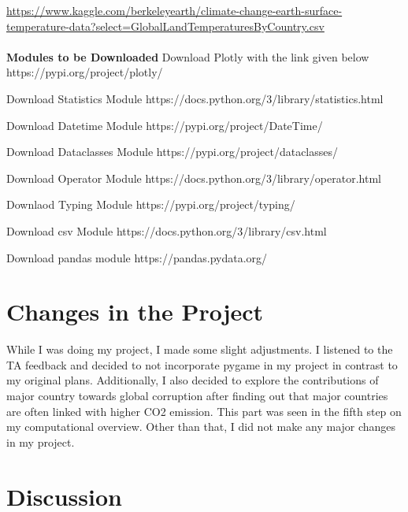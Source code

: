 \documentclass[fontsize=11pt]{article}
\begin{document}
\href{https://www.kaggle.com/berkeleyearth/climate-change-earth-surface-temperature-data?select=GlobalLandTemperaturesByCountry.csv}{https://www.kaggle.com/berkeleyearth/climate-change-earth-surface-temperature-data?select=GlobalLandTemperaturesByCountry.csv} \\\\
\textbf{Modules to be Downloaded}
Download Plotly with the link given below
https://pypi.org/project/plotly/

Download Statistics Module
https://docs.python.org/3/library/statistics.html

Download Datetime Module
https://pypi.org/project/DateTime/

Download Dataclasses Module
https://pypi.org/project/dataclasses/

Download Operator Module
https://docs.python.org/3/library/operator.html

Downlaod Typing Module
https://pypi.org/project/typing/

Download csv Module
https://docs.python.org/3/library/csv.html

Download pandas module
https://pandas.pydata.org/

\section{Changes in the Project}
While I was doing my project, I made some slight adjustments. I listened to the TA feedback and decided to not incorporate pygame in my project in contrast to my original plans. Additionally, I also decided to explore the contributions of major country towards global corruption after finding out that major countries are often linked with higher CO2 emission. This part was seen in the fifth step on my computational overview. Other than that, I did not make any major changes in my project.

\section{Discussion}
\end{document}
